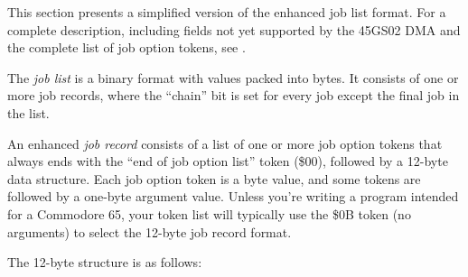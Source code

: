 This section presents a simplified version of the enhanced job list format.
For a complete description, including fields not yet supported by the 45GS02
DMA and the complete list of job option tokens, see .

The {\em job list} is a binary format with values packed into bytes.
It consists of one or more job records, where the ``chain'' bit is set for every
job except the final job in the list.

An enhanced {\em job record} consists of a list of one or more job
option tokens that always ends with the ``end of job option list'' token (\$00),
followed by a 12-byte data structure. Each job option token is a byte value, and
some tokens are followed by a one-byte argument value. Unless you're writing a
program intended for a Commodore 65, your token list will typically use the
\$0B token (no arguments) to select the 12-byte job record format.

The 12-byte structure is as follows:

